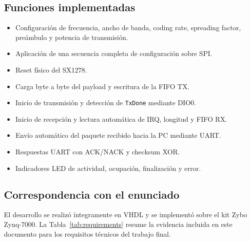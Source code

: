 \documentclass[11pt,a4paper]{article}
\newcommand{\module}[1]{\texttt{#1}}
\begin{document}
\subsection{Funciones implementadas}

\begin{itemize}
    \setlength{\itemsep}{1pt}
    \setlength{\parskip}{0pt}
    \setlength{\topsep}{4pt}
    \item Configuración de frecuencia, ancho de banda, coding rate, spreading
          factor, preámbulo y potencia de transmisión.
    \item Aplicación de una secuencia completa de configuración sobre SPI.
    \item Reset físico del SX1278.
    \item Carga byte a byte del payload y escritura de la FIFO TX.
    \item Inicio de transmisión y detección de \module{TxDone} mediante DIO0.
    \item Inicio de recepción y lectura automática de IRQ, longitud y FIFO RX.
    \item Envío automático del paquete recibido hacia la PC mediante UART.
    \item Respuestas UART con ACK/NACK y checksum XOR.
    \item Indicadores LED de actividad, ocupación, finalización y error.
\end{itemize}

\subsection{Correspondencia con el enunciado}

El desarrollo se realizó íntegramente en VHDL y se implementó sobre el kit
Zybo Zynq-7000. La Tabla~\ref{tab:requirements} resume la evidencia incluida
en este documento para los requisitos técnicos del trabajo final.
\end{document}
